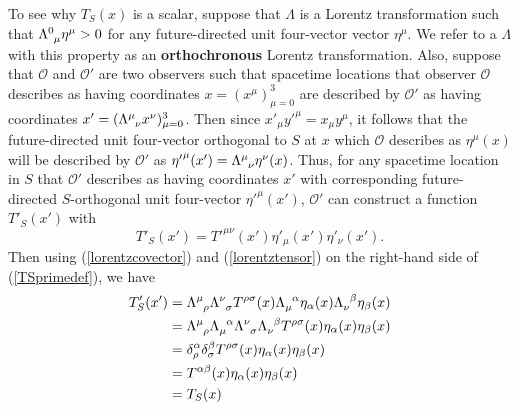 To see why $T_S(x)$ is a scalar, suppose that $\Lambda$ is a Lorentz transformation such that $\Lambda\indices{^0_\mu}\eta^\mu>0$ for any future-directed  unit four-vector vector $\eta^\mu$. We refer to a $\Lambda$ with this property as an \textbf{orthochronous} Lorentz transformation. Also, suppose that $\mathcal{O}$ and $\mathcal{O}'$ are two observers such that spacetime locations that observer $\mathcal{O}$ describes as having coordinates $x=(x^\mu)_{\mu=0}^3$ are described by $\mathcal{O}'$ as having coordinates $x'=(\Lambda\indices{^\mu_\nu}x^\nu)_{\mu=0}^3$. %
%
 Then since ${x'}_\mu{y'}^\mu= x_\mu y^\mu$, it follows that the future-directed unit four-vector orthogonal to $S$ at $x$ which $\mathcal{O}$ describes as $\eta^\mu(x)$ will be described by $\mathcal{O}'$ as  ${\eta'}^\mu(x')=\Lambda\indices{^\mu_\nu}\eta^\nu(x)$. %
  Thus, for any spacetime location in $S$ that $\mathcal{O}'$ describes as having coordinates $x'$ with corresponding  future-directed $S$-orthogonal unit four-vector ${\eta'}^\mu(x')$, $\mathcal{O}'$ can construct a function $T'_S(x')$  with 
\begin{equation}\label{TSprimedef}
T'_S(x')=T'^{\mu\nu}(x')\eta'_{\mu}(x')\eta'_{\nu}(x').
\end{equation} %
%
Then using  (\ref{lorentzcovector}) and (\ref{lorentztensor}) on the right-hand side of (\ref{TSprimedef}),  we have
\begin{equation}\label{invariantTS1}
\begin{split}
T'_S(x')&=\Lambda\indices{^\mu_\rho}\Lambda\indices{^\nu_\sigma}T^{\rho\sigma}(x)\Lambda\indices{_\mu^\alpha}\eta_{\alpha}(x)\Lambda\indices{_\nu^\beta}\eta_{\beta}(x)\\
&=\Lambda\indices{^\mu_\rho}\Lambda\indices{_\mu^\alpha} \Lambda\indices{^\nu_\sigma}\Lambda\indices{_\nu^\beta}T^{\rho\sigma}(x)\eta_{\alpha}(x)\eta_{\beta}(x)\\
&=\delta^\alpha_\rho\delta^\beta_\sigma T^{\rho\sigma}(x)\eta_{\alpha}(x)\eta_{\beta}(x)\\
&=T^{\alpha\beta}(x)\eta_{\alpha}(x)\eta_{\beta}(x)\\
&=T_S(x)
\end{split}
\end{equation}
